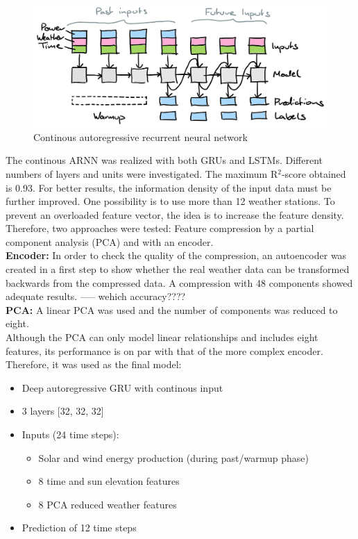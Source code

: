 \documentclass[11pt,table]{article}
\begin{document}
\begin{figure}[H]
	\centering
	\includegraphics[scale=1]{Figures/continousARNN.png}
	\caption{Continous autoregressive recurrent neural network}
	\label{fig:continousARNN}
\end{figure}

The continous ARNN was realized with both GRUs and LSTMs. Different numbers of layers and units were investigated. The maximum R$^2$-score obtained is 0.93. For better results, the information density of the input data must be further improved. One possibility is to use more than 12 weather stations. To prevent an overloaded feature vector, the idea is to increase the feature density. Therefore, two approaches were tested: Feature compression by a partial component analysis (PCA) and with an encoder.\\
\textbf{Encoder:}
In order to check the quality of the compression, an autoencoder was created in a first step to show whether the real weather data can be transformed backwards from the compressed data. A compression with 48 components showed adequate results. ----- wehich accuracy????\\
\textbf{PCA:}
A linear PCA was used and the number of components was reduced to eight.\\
Although the PCA can only model linear relationships and includes eight features, its performance is on par with that of the more complex encoder. Therefore, it was used as the final model:
\begin{itemize}
\item Deep autoregressive GRU with continous input
\item 3 layers [32, 32, 32]
\item Inputs (24 time steps):
\begin{itemize}
\item Solar and wind energy production (during past/warmup phase)
\item 8 time and sun elevation features
\item 8 PCA reduced weather features
\end{itemize}
\item Prediction of 12 time steps 
\end{itemize}
\end{document}

